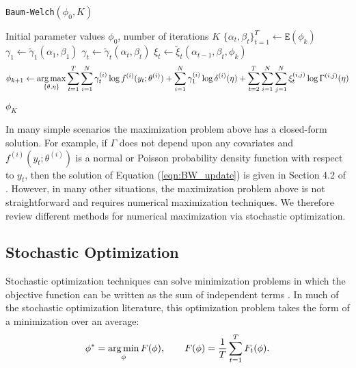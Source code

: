 \begin{algorithm}
\caption{\texttt{Baum-Welch}$(\phi_0,K)$}\label{alg:EM}
\begin{algorithmic}[1]
\Require Initial parameter values $\phi_0$, number of iterations $K$
    \State $\{\alpha_t,\beta_t\}_{t=1}^T \gets \texttt{E}(\phi_{k})$  
    \State $\gamma_1 \gets \tilde \gamma_1(\alpha_{1},\beta_{1})$
        \State $\gamma_t \gets \tilde \gamma_t(\alpha_{t},\beta_{t})$
        \State $\xi_t \gets \tilde \xi_t(\alpha_{t-1},\beta_{t},\phi_{k})$
    \EndFor
    \State {} $$\phi_{k+1} \gets \operatorname*{arg\,max}_{\{\theta,\eta\}} \sum_{t = 1}^T \sum_{i=1}^N \gamma^{(i)}_t \log f^{(i)}(y_t;\theta^{(i)}) + \sum_{i=1}^N \gamma^{(i)}_1 \log \delta^{(i)}(\eta) + \sum_{t=2}^{T} \sum_{i=1}^N \sum_{j=1}^N \xi_t^{(i,j)} \log \Gamma^{(i,j)}(\eta)$$
\EndFor
\State \Return $\phi_K$
\end{algorithmic}
\end{algorithm}

In many simple scenarios the maximization problem above has a closed-form solution. For example, if $\Gamma$ does not depend upon any covariates and $f^{(i)}(y_t;\theta^{(i)})$ is a normal or Poisson probability density function with respect to $y_t$, then the solution of Equation (\ref{eqn:BW_update}) is given in Section 4.2 of \citet{Zucchini:2016}. However, in many other situations, the maximization problem above is not straightforward and requires numerical maximization techniques. %
We therefore review different methods for numerical maximization via stochastic optimization. %

\subsection{Stochastic Optimization}
\label{subsec:stoch_optim}

Stochastic optimization techniques can solve minimization problems in which the objective function can be written as the sum of independent terms \citep{Robbins:1951}. In much of the stochastic optimization literature, this optimization problem takes the form of a minimization over an average:
%
\begin{equation}
    \phi^* = \operatorname*{arg\,min}_{\phi} F(\phi), \qquad F(\phi) = \frac{1}{T}\sum_{t = 1}^T F_t(\phi).
    \label{eqn:stoch_opt}
\end{equation}
%

